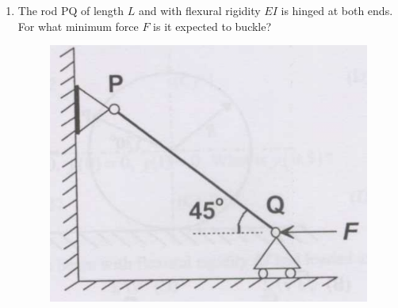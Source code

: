\documentclass[journal,12pt,onecolumn]{IEEEtran}
\begin{document}
\begin{enumerate}
          \begin{enumerate}
          \end{enumerate}

    \item The rod PQ of length $L$ and with flexural rigidity $EI$ is hinged at both ends. For what minimum force $F$ is it expected to buckle?\\

          \begin{figure}[H]
              \centering
              \includegraphics[scale=0.3]{q36}
              \caption{}
              \label{q36}
          \end{figure}

          \begin{enumerate}
          \end{enumerate}


\end{enumerate}
\end{document}
